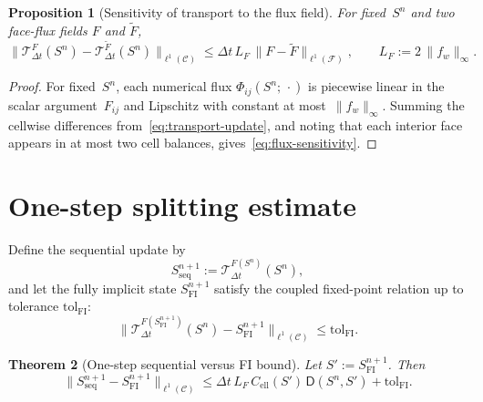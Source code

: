\documentclass[11pt]{article}
\newtheorem{theorem}{Theorem}[section]
\newtheorem{proposition}[theorem]{Proposition}
\begin{document}
\begin{proposition}[Sensitivity of transport to the flux field]
\label{prop:flux-sensitivity}
For fixed~$S^n$ and two face-flux fields $F$ and $\widetilde{F}$,
\begin{equation}\label{eq:flux-sensitivity}
  \bigl\|\mathcal{T}^{F}_{\Delta t}(S^n)
    - \mathcal{T}^{\widetilde{F}}_{\Delta t}(S^n)
  \bigr\|_{\ell^1(\mathcal{C})}
    \le \Delta t\,L_F\,\|F - \widetilde{F}\|_{\ell^1(\mathcal{F})},
  \qquad L_F := 2\,\|f_w\|_\infty.
\end{equation}
\end{proposition}

\begin{proof}
For fixed~$S^n$, each numerical flux $\Phi_{ij}(S^n;\,\cdot)$ is piecewise
linear in the scalar argument~$F_{ij}$ and Lipschitz with constant at
most~$\|f_w\|_\infty$.  Summing the cellwise differences
from~\eqref{eq:transport-update}, and noting that each interior face appears
in at most two cell balances, gives~\eqref{eq:flux-sensitivity}.
\end{proof}

\section{One-step splitting estimate}\label{sec:one-step}

Define the sequential update by
\[
  S^{n+1}_{\mathrm{seq}}
    := \mathcal{T}^{F(S^n)}_{\Delta t}(S^n),
\]
and let the fully implicit state $S^{n+1}_{\mathrm{FI}}$ satisfy the coupled
fixed-point relation up to tolerance $\mathrm{tol}_{\mathrm{FI}}$:
\begin{equation}\label{eq:FI-tol}
  \bigl\|\mathcal{T}^{F(S^{n+1}_{\mathrm{FI}})}_{\Delta t}(S^n)
    - S^{n+1}_{\mathrm{FI}}\bigr\|_{\ell^1(\mathcal{C})}
    \le \mathrm{tol}_{\mathrm{FI}}.
\end{equation}

\begin{theorem}[One-step sequential versus FI bound]\label{thm:one-step}
Let $S' := S^{n+1}_{\mathrm{FI}}$.  Then
\begin{equation}\label{eq:one-step}
  \|S^{n+1}_{\mathrm{seq}} - S^{n+1}_{\mathrm{FI}}\|_{\ell^1(\mathcal{C})}
    \le \Delta t\,L_F\,C_{\mathrm{ell}}(S')\,\mathsf{D}(S^n,S')
      + \mathrm{tol}_{\mathrm{FI}}.
\end{equation}
\end{theorem}
\end{document}
